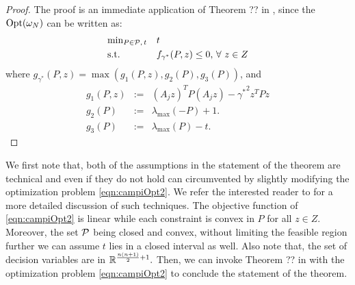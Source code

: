 \begin{proof}The proof is an immediate application of Theorem ?? in \cite{campi}, since the $\text{Opt}(\omega_N)$
can be written as:
\begin{equation}
\label{eqn:campiOpt2}
\begin{aligned}
& \text{min}_{P \in \mathcal{P},\, t} & & t \\
& \text{s.t.} 
& & f_{\gamma^*}(P, z) \leq 0,\,\forall\ z \in Z\end{aligned}
\end{equation}
where $g_{\gamma^*}(P,z) = \max(g_1(P, z), g_2(P), g_3(P))$, and 
\begin{eqnarray*}
g_1(P, z) &:=& (A_j z)^TP(A_j z) - {\gamma^*}^2 z^TPz \\
g_2(P) &:=& \lambda_{\max}(-P) +1. \\
g_3(P) &:=&  \lambda_{\max}(P) - t.
\end{eqnarray*}
\end{proof}
We first note that, both of the assumptions in the statement of the theorem are technical and even if they do not hold can circumvented by slightly modifying the optimization problem \ref{eqn:campiOpt2}. We refer the interested reader to \cite{campi} for a more detailed discussion of such techniques. The objective function of \eqref{eqn:campiOpt2} is linear while each constraint is convex in $P$ for all $z \in Z$. Moreover, the set $\mathcal{P}$ being closed and convex, without limiting the feasible region further we can assume $t$ lies in a closed interval as well. Also note that, the set of decision variables are in $\mathbb{R}^{\frac{n(n+1)}{2}+1}.$  Then, we can invoke Theorem ?? in \cite{campi} with the optimization problem \eqref{eqn:campiOpt2} to conclude the statement of the theorem.
\begin{theorem}\label{thm:mainTheorem1}
\end{theorem}

\begin{theorem}\label{thm:mainTheorem}
\end{theorem}


